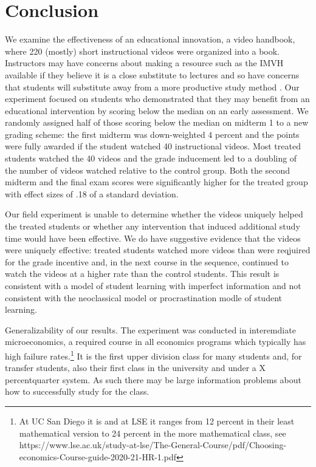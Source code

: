 \documentclass[12pt]{article}
\begin{document}
\section{Conclusion} \label{conclusion}

We examine the effectiveness of an educational innovation, a video handbook, where 220 (mostly) short instructional videos were organized into a book. Instructors may have concerns about making a resource such as the IMVH available if they believe it is a close substitute to lectures and so have concerns that students will substitute away from a more productive study method \textcite{kay2012} . Our experiment focused on students who demonstrated that they may benefit from an educational intervention by scoring below the median on an early assessment. We randomly assigned half of those scoring below the median on midterm 1 to a new grading scheme: the first midterm was down-weighted 4 percent and the points were fully awarded if the student watched 40 instructional videos. Most treated students watched the 40 videos and the grade inducement led to a doubling of the number of videos watched relative to the control group. Both the second midterm and the final exam scores were significantly higher for the treated group with effect sizes of .18 of a standard deviation.

Our field experiment is unable to determine whether the videos uniquely helped the treated students or whether any intervention that induced additional study time would have been effective. We do have suggestive evidence that the videos were uniquely effective: treated students watched more videos than were reqjuired for the grade incentive and, in the next course in the sequence, continued to watch the videos at a higher rate than the control students. This result is consistent with a model of student learning with imperfect information and not consistent with the neoclassical model or procrastination modle of student learning.

Generalizability of our results. The experiment was conducted in interemdiate microeconomics, a required course in all economics programs which typically has high failure rates.\footnote{At UC San Diego it is and at LSE it ranges from 12 percent in their least mathematical version to 24 percent in the more mathematical class, see https://www.lse.ac.uk/study-at-lse/The-General-Course/pdf/Choosing-economics-Course-guide-2020-21-HR-1.pdf} It is the first upper division class for many students and, for transfer students, also their first class in the university and under a X percentquarter system. As such there may be large information problems about how to successfully study for the class.
\end{document}
